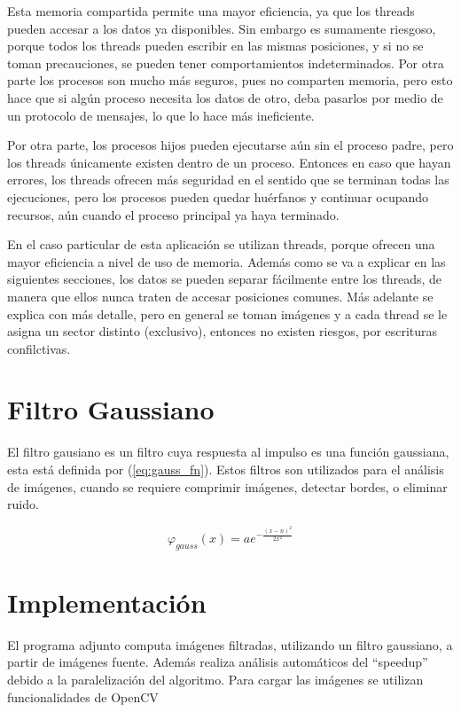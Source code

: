 \documentclass {article}
\begin{document}
Esta memoria compartida permite una mayor eficiencia, ya que los threads pueden
accesar a los datos ya disponibles. Sin embargo es sumamente riesgoso, porque todos los
threads pueden escribir en las mismas posiciones, y si no se toman precauciones, se pueden tener
comportamientos indeterminados. Por otra parte los procesos son mucho más seguros, pues no comparten
memoria, pero esto hace que si algún proceso necesita los datos de otro, deba pasarlos por medio de
un protocolo de mensajes, lo que lo hace más ineficiente.

Por otra parte, los procesos hijos pueden ejecutarse aún sin el proceso padre, pero los threads
únicamente existen dentro de un proceso. Entonces en caso que hayan errores, los threads ofrecen más
seguridad en el sentido que se terminan todas las ejecuciones, pero los procesos pueden quedar huérfanos y
continuar ocupando recursos, aún cuando el proceso principal ya haya terminado.

En el caso particular de esta aplicación se utilizan threads, porque ofrecen una mayor eficiencia a
nivel de uso de memoria. Además como se va a explicar en las siguientes secciones, los datos se
pueden separar fácilmente entre los threads, de manera que ellos nunca traten de accesar posiciones
comunes. Más adelante se explica con más detalle, pero en general se toman imágenes y a cada thread
se le asigna un sector distinto (exclusivo), entonces no existen riesgos, por escrituras
confilctivas. 


\section{Filtro Gaussiano}

El filtro gausiano es un filtro cuya respuesta al impulso es una función gaussiana, esta está
definida por (\ref{eq:gauss_fn}). Estos filtros son utilizados para el análisis de imágenes, cuando
se requiere comprimir imágenes, detectar bordes, o eliminar ruido. 

\begin{equation}
  \varphi_{gauss}(x)=ae^{-\frac{(x-n)^2}{2x^2}}
\label{eq:gauss_fn}
\end{equation}



\section{Implementación}

El programa adjunto computa imágenes filtradas, utilizando un filtro gaussiano, a partir de imágenes
fuente. Además realiza análisis automáticos del ``speedup'' debido a la paralelización del
algoritmo. Para cargar las imágenes se utilizan funcionalidades de OpenCV %
\end{document}
